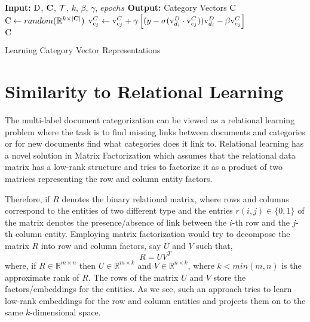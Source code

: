 \begin{algorithm}[h]
\begin{algorithmic}[1]
 \State \textbf{Input: } $\mathrm{D}$, $\mathbf{C}$, $\mathcal{T}$, $k$, $\beta$, $\gamma$, $epochs$
 \State \textbf{Output: } Category Vectors $\mathrm{C}$
 \State $\mathrm{C} \gets random(\mathbb{R}^{k \times |\mathbf{C}|})$
  \State $\mathrm{v}^{C}_{c_{j}} \gets \mathrm{v}^{C}_{c_{j}} + \gamma \left[ ( y - \sigma(\mathrm{v}^{D}_{d_{i}}\cdot \mathrm{v}^{C}_{c_{j}})) \mathrm{v}^{D}_{d_{i}} -\beta\mathrm{v}^{C}_{c_{j}} \right]$
 \EndFor 
 \EndWhile
 \\
 \Return $\mathrm{C}$
\end{algorithmic}
\caption{Learning Category Vector Representations}
\label{alg:cat_embeddings}
\end{algorithm}

\section{Similarity to Relational Learning}
\label{sec:lr_similar_rl}
The multi-label document categorization can be viewed as a relational learning problem where the task is to find missing links between documents and categories or for new documents find what categories does it link to. Relational learning has a novel solution in Matrix Factorization which assumes that the relational data matrix has a low-rank structure and tries to factorize it as a product of two matrices representing the row and column entity factors. 

Therefore, if $R$ denotes the binary relational matrix, where rows and columns correspond to the entities of two different type and the entries $r(i, j) \in \{0,1\}$ of the matrix denotes the presence/absence of link between the $i$-th row and the $j$-th column entity. Employing matrix factorization would try to decompose the matrix $R$ into row and column factors, say $U$ and $V$ such that,
\begin{equation}
\label{eq:mf_decompose}
R = UV^{T}
\end{equation}
where, if $R \in \mathbb{R}^{m \times n}$ then $U \in \mathbb{R}^{m \times k}$ and $V \in \mathbb{R}^{n \times k}$, where $k < min(m, n)$ is the approximate rank of $R$. The rows of the matrix $U$ and $V$ store the factors/embeddings for the entities. As we see, such an approach tries to learn low-rank embeddings for the row and column entities and projects them on to the same $k$-dimensional space.

